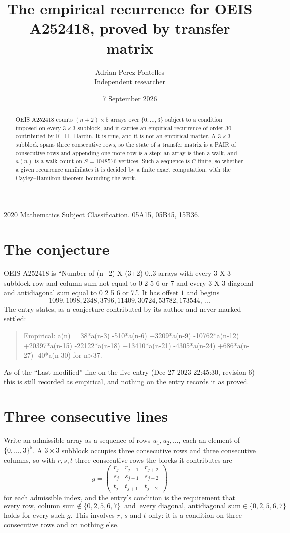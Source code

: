 \documentclass[11pt,a4paper]{article}
\title{The empirical recurrence for OEIS A252418, proved by transfer matrix}
\author{Adrian Perez Fontelles\\ \small Independent researcher}
\date{7 September 2026}
\theoremstyle{plain}
\theoremstyle{definition}
\begin{document}
\maketitle

\begin{abstract}
OEIS A252418 counts $(n+2)\times5$ arrays over $\{0,\dots,3\}$ subject to a condition imposed on
every $3\times3$ subblock, and it carries an empirical recurrence of order $30$
contributed by R.~H.~Hardin. It is true, and it is not an empirical matter. A $3\times3$
subblock spans three consecutive rows, so the state of a transfer matrix is a PAIR of
consecutive rows and appending one more row is a step; an array is then a walk, and
$a(n)$ is a walk count on $S=1048576$ vertices. Such a sequence is $C$-finite, so whether a given
recurrence annihilates it is decided by a finite exact computation, with the Cayley--Hamilton
theorem bounding the work.
\end{abstract}

\noindent\small 2020 Mathematics Subject Classification. 05A15, 05B45, 15B36.\normalsize

\section{The conjecture}

OEIS A252418 is ``Number of (n+2) X (3+2) 0..3 arrays with every 3 X 3 subblock row and column sum not equal to 0 2 5 6 or 7 and every 3 X 3 diagonal and antidiagonal sum equal to 0 2 5 6 or 7.''. It has offset $1$ and begins
\[
1099, 1098, 2348, 3796, 11409, 30724, 53782, 173544,\ \dots
\]
The entry states, as a conjecture contributed by its author and never marked settled:
\begin{quote}
Empirical: a(n) = 38*a(n-3) -510*a(n-6) +3209*a(n-9) -10762*a(n-12) +20397*a(n-15) -22122*a(n-18) +13410*a(n-21) -4305*a(n-24) +686*a(n-27) -40*a(n-30) for n>37.
\end{quote}
As of the ``Last modified'' line on the live entry (Dec 27 2023 22:45:30, revision 6) this is still
recorded as empirical, and nothing on the entry records it as proved.

\section{Three consecutive lines}

Write an admissible array as a sequence of rows $u_1,u_2,\dots$, each an element of
$\{0,\dots,3\}^{5}$. A $3\times3$ subblock occupies three consecutive rows and
three consecutive columns, so with $r,s,t$ three consecutive rows the blocks it
contributes are
\[
g=\begin{pmatrix}r_j&r_{j+1}&r_{j+2}\\ s_j&s_{j+1}&s_{j+2}\\ t_j&t_{j+1}&t_{j+2}\end{pmatrix}
\]
for each admissible index, and the entry's condition is the requirement that
\[
\text{every row, column sum} \notin \{0,2,5,6,7\}\ \text{ and }\ \text{every diagonal, antidiagonal sum} \in \{0,2,5,6,7\}
\]
holds for every such $g$. This involves $r$, $s$ and $t$ only: it is a condition on
three consecutive rows and on nothing else.
\end{document}
